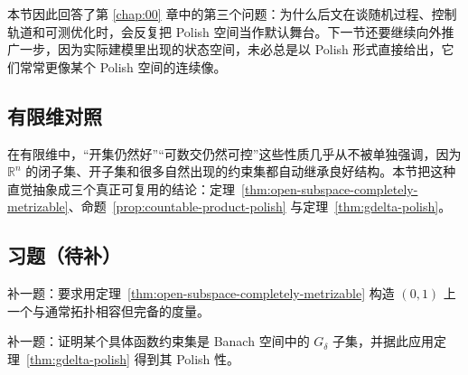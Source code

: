 本节因此回答了第 \ref{chap:00} 章中的第三个问题：为什么后文在谈随机过程、控制轨道和可测优化时，会反复把 Polish 空间当作默认舞台。下一节还要继续向外推广一步，因为实际建模里出现的状态空间，未必总是以 Polish 形式直接给出，它们常常更像某个 Polish 空间的连续像。

\subsection*{有限维对照}

在有限维中，“开集仍然好”“可数交仍然可控”这些性质几乎从不被单独强调，因为 $\mathbb R^n$ 的闭子集、开子集和很多自然出现的约束集都自动继承良好结构。本节把这种直觉抽象成三个真正可复用的结论：定理~\ref{thm:open-subspace-completely-metrizable}、命题~\ref{prop:countable-product-polish} 与定理~\ref{thm:gdelta-polish}。

\subsection*{习题（待补）}

\begin{exercise}[开子空间完备化占位]\label{exr:open-subspace-placeholder}
补一题：要求用定理~\ref{thm:open-subspace-completely-metrizable} 构造 $(0,1)$ 上一个与通常拓扑相容但完备的度量。
\end{exercise}

\begin{exercise}\label{exr:gdelta-placeholder}
补一题：证明某个具体函数约束集是 Banach 空间中的 $G_\delta$ 子集，并据此应用定理~\ref{thm:gdelta-polish} 得到其 Polish 性。
\end{exercise}
